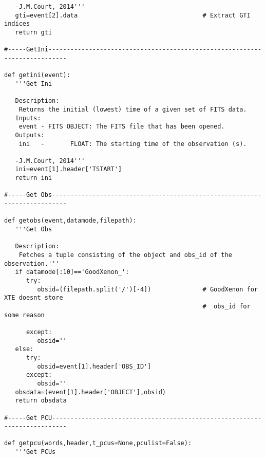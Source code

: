\begin{verbatim}
   -J.M.Court, 2014'''
   gti=event[2].data                                  # Extract GTI indices
   return gti

#-----GetIni---------------------------------------------------------------------------

def getini(event):
   '''Get Ini
   
   Description:
    Returns the initial (lowest) time of a given set of FITS data.
   Inputs:
    event - FITS OBJECT: The FITS file that has been opened.
   Outputs:
    ini   -       FLOAT: The starting time of the observation (s).
    
   -J.M.Court, 2014'''
   ini=event[1].header['TSTART']
   return ini

#-----Get Obs--------------------------------------------------------------------------

def getobs(event,datamode,filepath):
   '''Get Obs
   
   Description:
    Fetches a tuple consisting of the object and obs_id of the observation.'''
   if datamode[:10]=='GoodXenon_':
      try:
         obsid=(filepath.split('/')[-4])              # GoodXenon for XTE doesnt store
                                                      #  obs_id for some reason

      except:
         obsid=''
   else:
      try:
         obsid=event[1].header['OBS_ID']
      except:
         obsid=''
   obsdata=(event[1].header['OBJECT'],obsid)
   return obsdata

#-----Get PCU--------------------------------------------------------------------------

def getpcu(words,header,t_pcus=None,pculist=False):
   '''Get PCUs
   

\end{verbatim}
